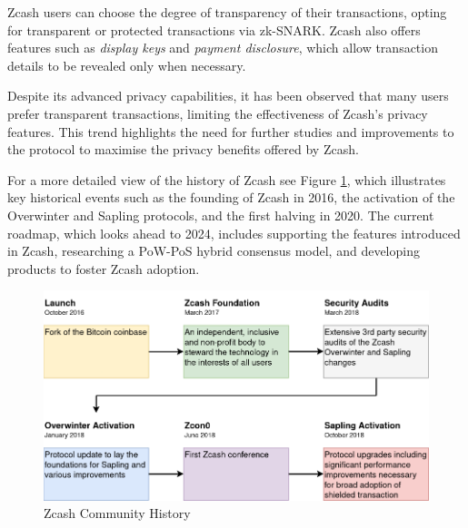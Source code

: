 \noindent Zcash users can choose the degree of transparency of their transactions, opting for transparent or protected transactions via zk-SNARK. Zcash also offers features such as \textit{display keys} and \textit{payment disclosure}, which allow transaction details to be revealed only when necessary.

\noindent Despite its advanced privacy capabilities, it has been observed that many users prefer transparent transactions, limiting the effectiveness of Zcash's privacy features. This trend highlights the need for further studies and improvements to the protocol to maximise the privacy benefits offered by Zcash.

\noindent For a more detailed view of the history of Zcash see Figure \ref{fig:timeline}, which illustrates key historical events such as the founding of Zcash in 2016, the activation of the Overwinter and Sapling protocols, and the first halving in 2020. The current roadmap, which looks ahead to 2024, includes supporting the features introduced in Zcash, researching a PoW-PoS hybrid consensus model, and developing products to foster Zcash adoption.

\begin{figure}[!ht]
    \centering
    \includegraphics[width=1\linewidth]{img/timeline.png}
    \caption{Zcash Community History \cite{youtube}}
    \label{fig:timeline}
\end{figure}